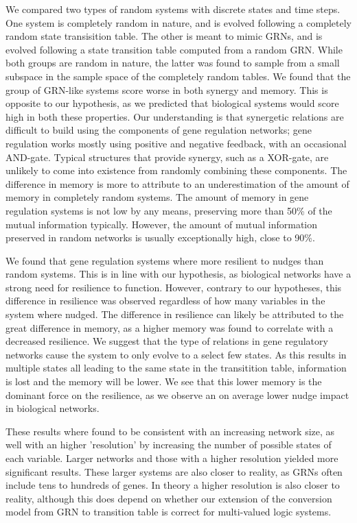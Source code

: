 \documentclass[../main.tex]{subfiles}
\begin{document}
We compared two types of random systems with discrete states and time steps.
One system is completely random in nature, and is evolved following a completely random state transisition table.
The other is meant to mimic GRNs, and is evolved following a state transition table computed from a random GRN.
While both groups are random in nature, the latter was found to sample from a small subspace in the sample space of the completely random tables.
We found that the group of GRN-like systems score worse in both synergy and memory.
This is opposite to our hypothesis, as we predicted that biological systems would score high in both these properties.
Our understanding is that synergetic relations are difficult to build using the components of gene regulation networks; gene regulation works mostly using positive and negative feedback, with an occasional AND-gate.
Typical structures that provide synergy, such as a XOR-gate, are unlikely to come into existence from randomly combining these components.
The difference in memory is more to attribute to an underestimation of the amount of memory in completely random systems.
The amount of memory in gene regulation systems is not low by any means, preserving more than 50\% of the mutual information typically.
However, the amount of mutual information preserved in random networks is usually exceptionally high, close to 90\%.

We found that gene regulation systems where more resilient to nudges than random systems.
This is in line with our hypothesis, as biological networks have a strong need for resilience to function.
However, contrary to our hypotheses, this difference in resilience was observed regardless of how many variables in the system where nudged.
The difference in resilience can likely be attributed to the great difference in memory, as a higher memory was found to correlate with a decreased resilience.
We suggest that the type of relations in gene regulatory networks cause the system to only evolve to a select few states.
As this results in multiple states all leading to the same state in the transitition table, information is lost and the memory will be lower.
We see that this lower memory is the dominant force on the resilience, as we observe an on average lower nudge impact in biological networks.

These results where found to be consistent with an increasing network size, as well with an higher 'resolution' by increasing the number of possible states of each variable.
Larger networks and those with a higher resolution yielded more significant results.
These larger systems are also closer to reality, as GRNs often include tens to hundreds of genes.
In theory a higher resolution is also closer to reality, although this does depend on whether our extension of the conversion model from GRN to transition table is correct for multi-valued logic systems.
\end{document}
